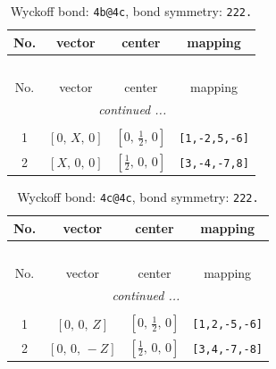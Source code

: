 \documentclass[fleqn,8pt]{jsarticle}
\begin{document}
\renewcommand{\arraystretch}{1.2}
\begin{longtable}{cccc}
\caption{Wyckoff bond: {\tt 4b@4c}, bond symmetry: {\tt 222.}}
 \\
 \hline \hline
No. & vector & center & mapping \\ \hline \endfirsthead

\multicolumn{3}{l}{\tablename\ \thetable{}} \\
 \hline \hline
No. & vector & center & mapping \\ \hline \endhead

 \hline \hline
\multicolumn{3}{r}{\footnotesize\it continued ...} \\ \endfoot

 \hline \hline
\multicolumn{3}{r}{} \\ \endlastfoot

1 & $\left[ 0,\, X,\, 0 \right]$ & $\left[ 0,\, \frac{1}{2},\, 0 \right]$ & {\tt [1,-2,5,-6]} \\ \hline
2 & $\left[ X,\, 0,\, 0 \right]$ & $\left[ \frac{1}{2},\, 0,\, 0 \right]$ & {\tt [3,-4,-7,8]} \\
\end{longtable}
\renewcommand{\arraystretch}{1.2}
\begin{longtable}{cccc}
\caption{Wyckoff bond: {\tt 4c@4c}, bond symmetry: {\tt 222.}}
 \\
 \hline \hline
No. & vector & center & mapping \\ \hline \endfirsthead

\multicolumn{3}{l}{\tablename\ \thetable{}} \\
 \hline \hline
No. & vector & center & mapping \\ \hline \endhead

 \hline \hline
\multicolumn{3}{r}{\footnotesize\it continued ...} \\ \endfoot

 \hline \hline
\multicolumn{3}{r}{} \\ \endlastfoot

1 & $\left[ 0,\, 0,\, Z \right]$ & $\left[ 0,\, \frac{1}{2},\, 0 \right]$ & {\tt [1,2,-5,-6]} \\ \hline
2 & $\left[ 0,\, 0,\, - Z \right]$ & $\left[ \frac{1}{2},\, 0,\, 0 \right]$ & {\tt [3,4,-7,-8]} \\
\end{longtable}
\renewcommand{\arraystretch}{1.2}
\end{document}

